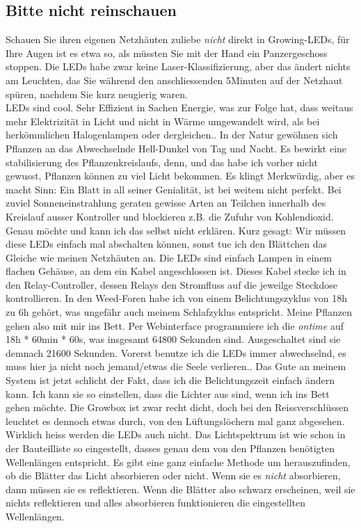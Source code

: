 \documentclass[12pt,titlepage,a4paper]{article}
\begin{document}
\subsection{Bitte nicht reinschauen}
Schauen Sie ihren eigenen Netzhäuten zuliebe \textit{nicht} direkt in Growing-LEDs, für Ihre Augen ist es etwa so, als müssten Sie mit der Hand ein Panzergeschoss stoppen. Die LEDs habe zwar keine Laser-Klassifizierung, aber das ändert nichts am Leuchten, das Sie während den anschliessenden 5Minuten auf der Netzhaut spüren, nachdem Sie kurz neugierig waren.\\LEDs sind cool. Sehr Effizient in Sachen Energie, was zur Folge hat, dass weitaus mehr Elektrizität in Licht und nicht in Wärme umgewandelt wird, als bei herkömmlichen Halogenlampen oder dergleichen.. In der Natur gewöhnen sich Pflanzen an das Abwechselnde Hell-Dunkel von Tag und Nacht. Es bewirkt eine stabilisierung des Pflanzenkreislaufs, denn, und das habe ich vorher nicht gewusst, Pflanzen können zu viel Licht bekommen. Es klingt Merkwürdig, aber es macht Sinn: Ein Blatt in all seiner Genialität, ist bei weitem nicht perfekt. Bei zuviel Sonneneinstrahlung geraten gewisse Arten an Teilchen innerhalb des Kreislauf ausser Kontroller und blockieren z.B. die Zufuhr von Kohlendioxid. Genau möchte und kann ich das selbst nicht erklären. Kurz gesagt: Wir müssen diese LEDs einfach mal abschalten können, sonst tue ich den Blättchen das Gleiche wie meinen Netzhäuten an. Die LEDs sind einfach Lampen in einem flachen Gehäuse, an dem ein Kabel angeschlossen ist. Dieses Kabel stecke ich in den Relay-Controller, dessen Relays den Stromfluss auf die jeweilge Steckdose kontrollieren. In den Weed-Foren habe ich von einem Belichtungszyklus von 18h zu 6h gehört, was ungefähr auch meinem Schlafzyklus entspricht. Meine Pflanzen gehen also mit mir ins Bett. Per Webinterface programmiere ich die \textit{ontime} auf 18h * 60min * 60s, was insgesamt 64800 Sekunden sind. Ausgeschaltet sind sie demnach 21600 Sekunden. Vorerst benutze ich die LEDs immer abwechselnd, es muss hier ja nicht noch jemand/etwas die Seele verlieren.. Das Gute an meinem System ist jetzt schlicht der Fakt, dass ich die Belichtungszeit einfach ändern kann. Ich kann sie so einstellen, dass die Lichter aus sind, wenn ich ins Bett gehen möchte. Die Growbox ist zwar recht dicht, doch bei den Reissverschlüssen leuchtet es dennoch etwas durch, von den Lüftungslöchern mal ganz abgesehen. Wirklich heiss werden die LEDs auch nicht. Das Lichtspektrum ist wie schon in der Bauteilliste so eingestellt, dasses genau dem von den Pflanzen benötigten Wellenlängen entspricht. Es gibt eine ganz einfache Methode um herauszufinden, ob die Blätter das Licht absorbieren oder nicht. Wenn sie es \textit{nicht} absorbieren, dann müssen sie es reflektieren. Wenn die Blätter also schwarz erscheinen, weil sie nichts reflektieren und alles absorbieren funktionieren die eingestellten Wellenlängen.
\end{document}
